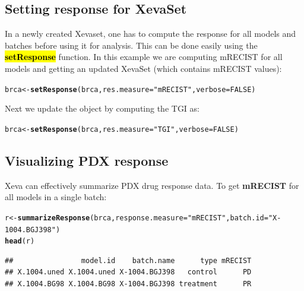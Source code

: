 \documentclass{article}\usepackage[]{graphicx}\usepackage[]{xcolor}
\makeatletter
\newcommand{\hlnum}[1]{\textcolor[rgb]{0.686,0.059,0.569}{#1}}%
\newcommand{\hlstr}[1]{\textcolor[rgb]{0.192,0.494,0.8}{#1}}%
\newcommand{\hlstd}[1]{\textcolor[rgb]{0.345,0.345,0.345}{#1}}%
\newcommand{\hlkwb}[1]{\textcolor[rgb]{0.69,0.353,0.396}{#1}}%
\newcommand{\hlkwc}[1]{\textcolor[rgb]{0.333,0.667,0.333}{#1}}%
\newcommand{\hlkwd}[1]{\textcolor[rgb]{0.737,0.353,0.396}{\textbf{#1}}}%
\newenvironment{kframe}{%
 \def\at@end@of@kframe{}%
 \ifinner\ifhmode%
  \def\at@end@of@kframe{\end{minipage}}%
  \begin{minipage}{\columnwidth}%
 \fi\fi%
 \def\FrameCommand##1{\hskip\@totalleftmargin \hskip-\fboxsep
 \colorbox{shadecolor}{##1}\hskip-\fboxsep
     \hskip-\linewidth \hskip-\@totalleftmargin \hskip\columnwidth}%
 \MakeFramed {\advance\hsize-\width
   \@totalleftmargin\z@ \linewidth\hsize
   \@setminipage}}%
 {\par\unskip\endMakeFramed%
 \at@end@of@kframe}
\newenvironment{knitrout}{}{} %
\makeatother
\begin{document}
\subsection{Setting response for XevaSet} \label{setresponse}
In a newly created Xevaset, one has to compute the response for all models and
batches before using it for analysis. This can be done easily using the \textbf{\textcolor{red}{\hl{setResponse}}}  function.
In this example we are computing mRECIST for all models and getting an updated
XevaSet (which contains mRECIST values):

\begin{knitrout}
\color{fgcolor}\begin{kframe}
\begin{alltt}
\hlstd{brca}  \hlkwb{<-} \hlkwd{setResponse}\hlstd{(brca,} \hlkwc{res.measure} \hlstd{=} \hlstr{"mRECIST"}\hlstd{,} \hlkwc{verbose}\hlstd{=}\hlnum{FALSE}\hlstd{)}
\end{alltt}
\end{kframe}
\end{knitrout}

Next we update the object by computing the TGI as:
\begin{knitrout}
\color{fgcolor}\begin{kframe}
\begin{alltt}
\hlstd{brca}  \hlkwb{<-} \hlkwd{setResponse}\hlstd{(brca,} \hlkwc{res.measure} \hlstd{=} \hlstr{"TGI"}\hlstd{,} \hlkwc{verbose}\hlstd{=}\hlnum{FALSE}\hlstd{)}
\end{alltt}
\end{kframe}
\end{knitrout}


\subsection{Visualizing PDX response} \label{visRes}
Xeva can effectively summarize PDX drug response data.
To get \textbf{mRECIST} for all models in a single batch:
\begin{knitrout}
\color{fgcolor}\begin{kframe}
\begin{alltt}
\hlstd{r} \hlkwb{<-} \hlkwd{summarizeResponse}\hlstd{(brca,}\hlkwc{response.measure}\hlstd{=}\hlstr{"mRECIST"}\hlstd{,}\hlkwc{batch.id}\hlstd{=}\hlstr{"X-1004.BGJ398"}\hlstd{)}
\hlkwd{head}\hlstd{(r)}
\end{alltt}
\begin{verbatim}
##                model.id    batch.name      type mRECIST
## X.1004.uned X.1004.uned X-1004.BGJ398   control      PD
## X.1004.BG98 X.1004.BG98 X-1004.BGJ398 treatment      PR
\end{verbatim}
\end{kframe}
\end{knitrout}
\end{document}
